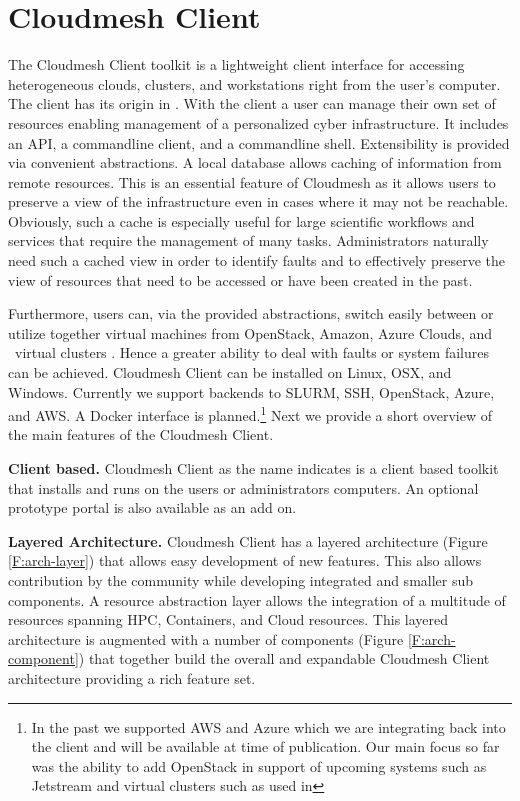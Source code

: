 
\section{Cloudmesh Client} \label{S:cloudmesh}

The Cloudmesh Client toolkit \cite{www-cloudmesh} is a lightweight
client interface for accessing heterogeneous clouds, clusters, and
workstations right from the user's computer.  The client has its
origin in \cite{Laszewski2007,laszewski09,laszewski10}. With the
client a user can manage their own set of resources enabling management of a
personalized cyber infrastructure. It includes an API, a commandline
client, and a commandline shell.  Extensibility is provided via
convenient abstractions.  A local database allows caching of
information from remote resources.  This is an essential feature of
Cloudmesh as it allows users to preserve a view of the infrastructure
even in cases where it may not be reachable. Obviously, such a cache is
especially useful for large scientific workflows and services that
require the management of many tasks.  Administrators naturally need
such a cached view in order to identify faults and to effectively
preserve the view of resources that need to be accessed or have been
created in the past.

Furthermore, users can, via the provided abstractions, switch easily
between or utilize together virtual machines from OpenStack, Amazon,
Azure Clouds, and \Comet~virtual clusters \cite{comet14}. Hence a greater ability to
deal with faults or system failures can be achieved. Cloudmesh Client
can be installed on Linux, OSX, and Windows. Currently we support
backends to SLURM, SSH, OpenStack, Azure, and AWS. A Docker interface
is planned.\footnote{In the past we supported AWS and Azure which we
  are integrating back into the client and will be available at time
  of publication. Our main focus so far was the ability to add
  OpenStack in support of upcoming systems such as Jetstream and
  virtual clusters such as used in \Comet } Next we provide a short
overview of the main features of the Cloudmesh Client.

{\parindent 0pt \bf Client based.} Cloudmesh Client as the name
indicates is a client based toolkit that installs and runs on the
users or administrators computers. An optional prototype portal is
also available as an add on.

{\parindent 0pt \bf Layered Architecture.} Cloudmesh Client has a
layered architecture (Figure \ref{F:arch-layer}) that allows easy
development of new features. This also allows contribution by the
community while developing integrated and smaller sub components. A
resource abstraction layer allows the integration of a multitude of
resources spanning HPC, Containers, and Cloud resources. This layered
architecture is augmented with a number of components (Figure
\ref{F:arch-component}) that together build the overall and expandable
Cloudmesh Client architecture providing a rich feature set.


